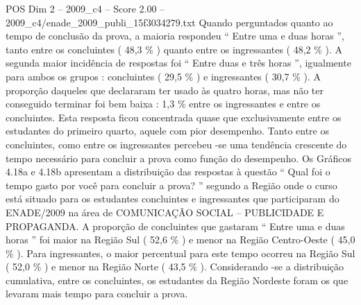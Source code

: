 \begin{textsample}{POS Dim 2 – 2009\_c4 – Score 2.00 – 2009\_c4/enade\_2009\_publi\_15f3034279.txt}
Quando perguntados quanto ao tempo de conclusão da prova, a maioria respondeu “ Entre uma e duas horas ”, tanto entre os concluintes ( 48,3 \% ) quanto entre os ingressantes ( 48,2 \% ).
A segunda maior incidência de respostas foi “ Entre duas e três horas ”, igualmente para ambos os grupos : concluintes ( 29,5 \% ) e ingressantes ( 30,7 \% ).
A proporção daqueles que declararam ter usado às quatro horas, mas não ter conseguido terminar foi bem baixa : 1,3 \% entre os ingressantes e entre os concluintes.
Esta resposta ficou concentrada quase que exclusivamente entre os estudantes do primeiro quarto, aquele com pior desempenho.
Tanto entre os concluintes, como entre os ingressantes percebeu -se uma tendência crescente do tempo necessário para concluir a prova como função do desempenho.
Os Gráficos 4.18a e 4.18b apresentam a distribuição das respostas à questão “ Qual foi o tempo gasto por você para concluir a prova? ” segundo a Região onde o curso está situado para os estudantes concluintes e ingressantes que participaram do ENADE/2009 na área de COMUNICAÇÃO SOCIAL – PUBLICIDADE E PROPAGANDA.
A proporção de concluintes que gastaram “ Entre uma e duas horas ” foi maior na Região Sul ( 52,6 \% ) e menor na Região Centro-Oeste ( 45,0 \% ).
Para ingressantes, o maior percentual para este tempo ocorreu na Região Sul ( 52,0 \% ) e menor na Região Norte ( 43,5 \% ).
Considerando -se a distribuição cumulativa, entre os concluintes, os estudantes da Região Nordeste foram os que levaram mais tempo para concluir a prova.

\end{textsample}
